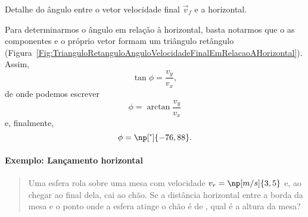 \begin{marginfigure}
\centering
{}
\caption{Detalhe do ângulo entre o vetor velocidade final $\vec{v}_f$ e a horizontal.\label{Fig:TrianguloRetanguloAnguloVelocidadeFinalEmRelacaoAHorizontal}}
\end{marginfigure}

Para determinarmos o ângulo em relação à horizontal, basta notarmos que o as componentes e o próprio vetor formam um triângulo retângulo (Figura~\ref{Fig:TrianguloRetanguloAnguloVelocidadeFinalEmRelacaoAHorizontal}). Assim,
\begin{equation}
	\tan\phi = \frac{v_y}{v_x},
\end{equation}
%
de onde podemos escrever
\begin{equation}
	\phi = \arctan \frac{v_y}{v_x}
\end{equation}
%
e, finalmente,
\begin{equation}
	\phi = \np[\tcdegree]{-76,88}.
\end{equation}

\paragraph{Exemplo: Lançamento horizontal}

\begin{quote}
	Uma esfera rola sobre uma mesa com velocidade $v_r = \np[m/s]{3,5}$ e, ao chegar ao final dela, cai ao chão. Se a distância horizontal entre a borda da mesa e o ponto onde a esfera atinge o chão é de , qual é a altura da mesa?
\end{quote}

